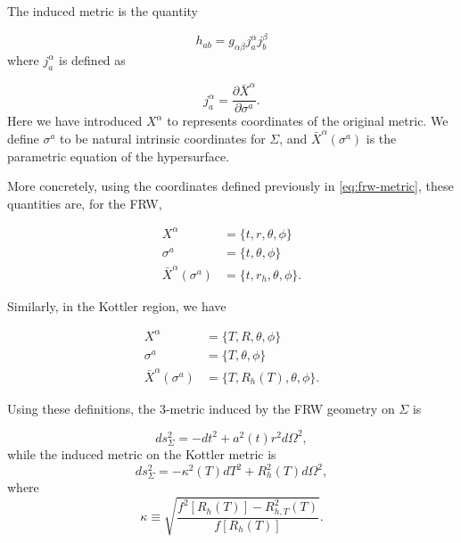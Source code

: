 The induced metric is the quantity 

\begin{equation}
  h_{ab} = g_{\alpha \beta} j^{\alpha}_{a} j^{\beta}_{b}
  \label{eq:induced-metric-defn}
\end{equation}
where $j^{\alpha}_{a}$ is defined as

\begin{equation}
  j^{\alpha}_{a} = \frac{\partial \bar{X}^{\alpha}}{\partial \sigma^a}.
  \label{eq:j-defn}
\end{equation}
Here we have introduced $X^{\alpha}$ to represents coordinates of the original metric. We define $\sigma^a$ to be natural intrinsic coordinates for $\Sigma$, and $\bar{X}^{\alpha}(\sigma^a)$ is the parametric equation of the hypersurface. 

More concretely, using the coordinates defined previously in \autoref{eq:frw-metric}, these quantities are, for the FRW, 

\begin{subequations}
  \begin{align}
    X^{\alpha} &= \{ t, r, \theta, \phi \} \\
    \sigma^a &= \{ t, \theta, \phi \} \\
    \bar{X}^{\alpha}(\sigma^a) &= \{ t, r_h, \theta, \phi\}.
  \end{align}
\end{subequations}

Similarly, in the Kottler region, we have 

\begin{subequations}
  \begin{align}
    X^{\alpha} &= \{ T, R, \theta, \phi \} \\
    \sigma^a &= \{ T, \theta, \phi \} \\
    \bar{X}^{\alpha}(\sigma^a) &= \{ T, R_h(T), \theta, \phi\}.
  \end{align}
\end{subequations}

Using these definitions, the 3-metric induced by the FRW geometry on $\Sigma$ is

\begin{equation}
  ds^2_{\Sigma} = -dt^2 + a^2(t)r^2 d \Omega^2,
  \label{eq:frw-induced-metric}
\end{equation}
while the induced metric on the Kottler metric is
\begin{equation}
  ds_{\Sigma}^2 = -\kappa^2(T)dT^2 + R_h^2(T) d \Omega^2,
  \label{eq:kottler-induced-metric}
\end{equation}
where
\begin{equation}
  \kappa \equiv \sqrt{\frac{f^2[R_h(T)] - R_{h,T}^2(T)}{f[R_h(T)]}}.
  \label{eq:kottler-kappa}
\end{equation}

